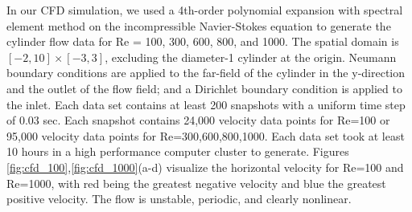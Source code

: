 In our CFD simulation, we used a 4th-order polynomial expansion with spectral element method on the incompressible Navier-Stokes equation to generate the cylinder flow data for Re = 100, 300, 600, 800, and 1000. The spatial domain is $\left[-2,10\right]\times\left[-3,3\right]$, excluding the diameter-1 cylinder at the origin.  Neumann boundary conditions are applied to the far-field of the cylinder in the y-direction and the outlet of the flow field; and a Dirichlet boundary condition is applied to the inlet. Each data set contains at least 200 snapshots with a uniform time step of 0.03 sec. Each snapshot contains 24,000 velocity data points for Re=100 or 95,000 velocity data points for Re=300,600,800,1000. Each data set took at least 10 hours in a high performance computer cluster to generate. Figures \ref{fig:cfd_100},\ref{fig:cfd_1000}(a-d) visualize the horizontal velocity for Re=100 and Re=1000, with red being the greatest negative velocity and blue the greatest positive velocity. The flow is unstable, periodic, and clearly nonlinear.

\begin{figure*}[h] %
	\centering
	\\
	
	\caption{Visualization of Fluid Flow at Re = 100, CFD (a-d), E-GP (e-h)}
	\label{fig:cfd_100}
\end{figure*}

\begin{figure*}[h] %
	\centering
	\\
	\caption{Visualization of Fluid Flow at Re = 1000, CFD (a-d), E-GP (e-h)}
	\label{fig:cfd_1000}
\end{figure*}

